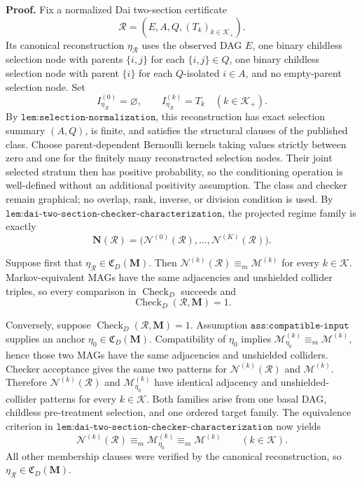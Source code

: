 \textbf{Proof.}
Fix a normalized Dai two-section certificate
\[
\mathcal R=(E,A,Q,(T_k)_{k\in\mathcal K_+}).
\]
Its canonical reconstruction \(\eta_{\mathcal R}\) uses the observed DAG \(E\), one binary childless selection node with parents \(\{i,j\}\) for each \(\{i,j\}\in Q\), one binary childless selection node with parent \(\{i\}\) for each \(Q\)-isolated \(i\in A\), and no empty-parent selection node.  Set
\[
I_{\eta_{\mathcal R}}^{(0)}=\varnothing,
\qquad
I_{\eta_{\mathcal R}}^{(k)}=T_k
\quad(k\in\mathcal K_+).
\]
By \(\texttt{lem:selection-normalization}\), this reconstruction has exact selection summary \((A,Q)\), is finite, and satisfies the structural clauses of the published class.  Choose parent-dependent Bernoulli kernels taking values strictly between zero and one for the finitely many reconstructed selection nodes.  Their joint selected stratum then has positive probability, so the conditioning operation is well-defined without an additional positivity assumption.  The class and checker remain graphical; no overlap, rank, inverse, or division condition is used.  By \(\texttt{lem:dai-two-section-checker-characterization}\), the projected regime family is exactly
\[
\mathbf N(\mathcal R)
=\bigl(\mathcal N^{(0)}(\mathcal R),\ldots,\mathcal N^{(K)}(\mathcal R)\bigr).
\]

Suppose first that \(\eta_{\mathcal R}\in\mathfrak C_D(\mathbf M)\).  Then \(\mathcal N^{(k)}(\mathcal R)\equiv_m\mathcal M^{(k)}\) for every \(k\in\mathcal K\).  Markov-equivalent MAGs have the same adjacencies and unshielded collider triples, so every comparison in \(\operatorname{Check}_{D}\) succeeds and
\[
\operatorname{Check}_{D}(\mathcal R,\mathbf M)=1.
\]

Conversely, suppose \(\operatorname{Check}_{D}(\mathcal R,\mathbf M)=1\).  Assumption \(\texttt{ass:compatible-input}\) supplies an anchor \(\eta_0\in\mathfrak C_D(\mathbf M)\).  Compatibility of \(\eta_0\) implies \(\mathcal M_{\eta_0}^{(k)}\equiv_m\mathcal M^{(k)}\), hence those two MAGs have the same adjacencies and unshielded colliders.  Checker acceptance gives the same two patterns for \(\mathcal N^{(k)}(\mathcal R)\) and \(\mathcal M^{(k)}\).  Therefore \(\mathcal N^{(k)}(\mathcal R)\) and \(\mathcal M_{\eta_0}^{(k)}\) have identical adjacency and unshielded-collider patterns for every \(k\in\mathcal K\).  Both families arise from one basal DAG, childless pre-treatment selection, and one ordered target family.  The equivalence criterion in \(\texttt{lem:dai-two-section-checker-characterization}\) now yields
\[
\mathcal N^{(k)}(\mathcal R)\equiv_m\mathcal M_{\eta_0}^{(k)}
\equiv_m\mathcal M^{(k)}
\qquad(k\in\mathcal K).
\]
All other membership clauses were verified by the canonical reconstruction, so \(\eta_{\mathcal R}\in\mathfrak C_D(\mathbf M)\).

